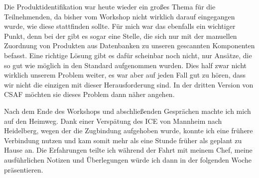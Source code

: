 Die Produktidentifikation war heute wieder ein großes Thema für die Teilnehmenden, da bisher vom Workshop nicht wirklich darauf eingegangen wurde, wie diese stattfinden sollte.
Für mich war das ebenfalls ein wichtiger Punkt, denn bei der \metaeffekt gibt es sogar eine Stelle, die sich nur mit der manuellen Zuordnung von Produkten aus Datenbanken zu unseren gescannten Komponenten befasst.
Eine richtige Lösung gibt es dafür scheinbar noch nicht, nur Ansätze, die so gut wie möglich in den Standard aufgenommen wurden.
Dies half zwar nicht wirklich unserem Problem weiter, es war aber auf jeden Fall gut zu hören, dass wir nicht die einzigen mit dieser Herausforderung sind.
In der dritten Version von CSAF möchten sie dieses Problem dann näher angehen.

Nach dem Ende des Workshops und abschließenden Gesprächen machte ich mich auf den Heimweg.
Dank einer Verspätung des ICE von Mannheim nach Heidelberg, wegen der die Zugbindung aufgehoben wurde, konnte ich eine frühere Verbindung nutzen und kam somit mehr als eine Stunde früher als geplant zu Hause an.
Die Erfahrungen teilte ich während der Fahrt mit meinem Chef, meine ausführlichen Notizen und Überlegungen würde ich dann in der folgenden Woche präsentieren.
